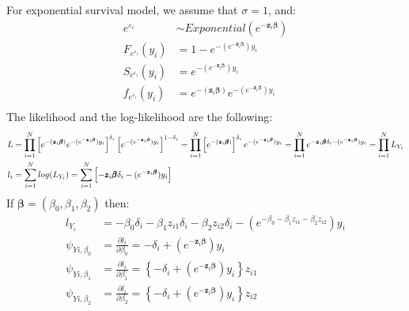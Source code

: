 \documentclass[]{article}
\let\epsilon\varepsilon
\begin{document}
For exponential survival model, we assume that $\sigma = 1$, and:
  $$
  \begin{aligned}
    e^{\epsilon_{i}} &\sim Exponential(e^{-\pmb{z}_i \pmb{\beta}})\\
    F_{e^{\epsilon_{i}}}(y_i) &= 1 - e^{-(e^{-\pmb{z}_i \pmb{\beta}})y_i}\\
    S_{e^{\epsilon_{i}}}(y_i) &= e^{-(e^{-\pmb{z}_i \pmb{\beta}})y_i}\\
    f_{e^{\epsilon_{i}}}(y_i) &= e^{-\left(\pmb{z}_i \pmb{\beta}\right)}e^{-(e^{-\pmb{z}_i \pmb{\beta}})y_i}\\
  \end{aligned}
  $$
The likelihood and the log-likelihood are the following:
  $$
  \begin{aligned}
    L &= \prod_{i=1}^N  \left[ e^{-\left(\pmb{z}_i \pmb{\beta}\right)}e^{-(e^{-\pmb{z}_i \pmb{\beta}})y_i} \right]^{\delta_i} \left[e^{-(e^{-\pmb{z}_i \pmb{\beta}})y_i}\right]^{1-\delta_i} =\prod_{i=1}^N   \left[e^{-\left(\pmb{z}_i \pmb{\beta}\right)}\right]^{\delta_i}   e^{-(e^{-\pmb{z}_i \pmb{\beta}})y_i} = \prod_{i=1}^N   e^{-\pmb{z}_i \pmb{\beta}\delta_i-(e^{-\pmb{z}_i \pmb{\beta}})y_i}=\prod_{i=1}^N L_{Y_i}\\
    l_i &=\sum_{i=1}^N log(L_{Y_i}) =\sum_{i=1}^N  \left[  -\pmb{z}_i \pmb{\beta}\delta_i-(e^{-\pmb{z}_i \pmb{\beta}})y_i \right]
  \end{aligned}\\
  $$
If $\pmb{\beta} = (\beta_0, \beta_1, \beta_2)$ then:
  $$
  \begin{aligned}
    l_{Y_i} &=   -\beta_0\delta_i-\beta_1 z_{i1}\delta_i-\beta_2z_{i2}\delta_i-(e^{-\beta_0-\beta_1 z_{i1}-\beta_2z_{i2} })y_i \\
    \psi_{Yi,\beta_0} &= \frac{\partial l_i}{\partial \beta_0} =  -\delta_i+\left(e^{-\pmb{z}_i \pmb{\beta}}\right)y_i\\
    \psi_{Yi,\beta_1} &= \frac{\partial l_i}{\partial \beta_1} =  \left\{-\delta_i+\left(e^{-\pmb{z}_i \pmb{\beta}}\right)y_i\right\}z_{i1} \\
    \psi_{Yi,\beta_2} &= \frac{\partial l_i}{\partial \beta_2} =  \left\{-\delta_i+\left(e^{-\pmb{z}_i \pmb{\beta}}\right)y_i\right\}z_{i2} \\
  \end{aligned}
  $$
  
\end{document}
